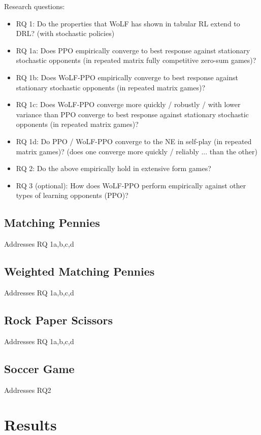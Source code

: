 \documentclass{article}
\begin{document}
Research questions:
\begin{itemize}
    \item RQ 1: Do the properties that WoLF has shown in tabular RL extend to DRL? (with stochastic policies)
    \item RQ 1a: Does PPO empirically converge to best response against stationary stochastic opponents (in repeated matrix fully competitive zero-sum games)?
    \item RQ 1b: Does WoLF-PPO empirically converge to best response against stationary stochastic opponents (in repeated matrix games)?
    \item RQ 1c: Does WoLF-PPO converge more quickly / robustly / with lower variance than PPO converge to best response against stationary stochastic opponents (in repeated matrix games)?
    \item RQ 1d: Do PPO / WoLF-PPO converge to the NE in self-play (in repeated matrix games)? (does one converge more quickly / reliably ... than the other)
    \item RQ 2: Do the above empirically hold in extensive form games?
    \item RQ 3 (optional): How does WoLF-PPO perform empirically against other types of learning opponents (PPO)?
\end{itemize}

\subsection{Matching Pennies}
Addresses RQ 1a,b,c,d

\subsection{Weighted Matching Pennies}
Addresses RQ 1a,b,c,d

\subsection{Rock Paper Scissors}
Addresses RQ 1a,b,c,d

\subsection{Soccer Game}
Addresses RQ2

\section{Results}
\end{document}
